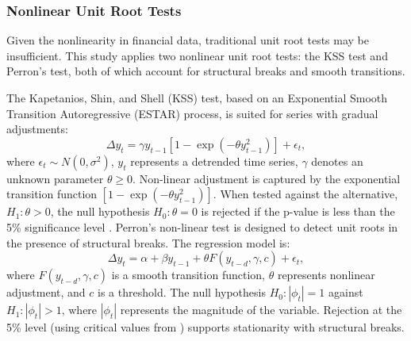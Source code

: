 \documentclass[a4paper]{article}
\theoremstyle{plain}
\theoremstyle{definition}
\theoremstyle{remark}
\begin{document}
\subsubsection{Nonlinear Unit Root Tests}

Given the nonlinearity in financial data, traditional unit root tests may be insufficient. This study applies two nonlinear unit root tests: the KSS test and Perron’s test, both of which account for structural breaks and smooth transitions.

The Kapetanios, Shin, and Shell (KSS) test, based on an Exponential Smooth Transition Autoregressive (ESTAR) process, is suited for series with gradual adjustments:
\begin{equation}\label{KSStest}
\Delta y_t = \gamma y_{t-1}[1 - \exp(-\theta y_{t-1}^2)] + \epsilon_t,
\end{equation}
where $\epsilon_{t} \sim N(0,\sigma^{2})$, $y_{t}$ represents a detrended time series, $\gamma$ denotes an unknown parameter $\theta \geq 0$. Non-linear adjustment is captured by the exponential transition function \( [1 - \exp(-\theta y_{t-1}^{2})] \). When tested against the alternative, \( H_{1}: \theta > 0 \), the null hypothesis \( H_{0}: \theta = 0 \) is rejected if the p-value is less than the 5\% significance level \citep{cuestas2010nonlinearities}.
Perron’s non-linear test \citep{perron1990testing} is designed to detect unit roots in the presence of structural breaks. The regression model is:
\begin{equation}\label{Perron}
\Delta y_t = \alpha + \beta y_{t-1} + \theta F(y_{t-d}, \gamma, c) + \epsilon_t,
\end{equation}
where $F(y_{t-d},\gamma,c)$ is a smooth transition function, $\theta$ represents nonlinear adjustment, and $c$ is a threshold. The null hypothesis  $H_{0}: |\phi_{t}| = 1$ against $H_{1}: |\phi_{t}| > 1$, where $|\phi_{t}|$ represents the magnitude of the variable. Rejection at the 5\% level (using critical values from \cite{perron1989great}) supports stationarity with structural breaks.
\end{document}

